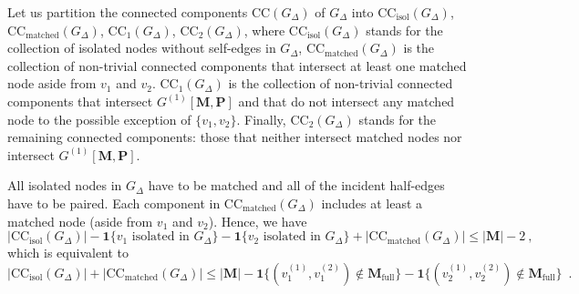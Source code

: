 \documentclass{article}
\begin{document}
Let us partition the connected components $\mathrm{CC}(G_{\Delta})$ of $G_{\Delta}$  into $\mathrm{CC}_{\mathrm{isol}}(G_{\Delta})$, $\mathrm{CC}_{\mathrm{matched}}(G_{\Delta})$, $\mathrm{CC}_{1}(G_{\Delta})$, $\mathrm{CC}_{2}(G_{\Delta})$, where 
$\mathrm{CC}_{\mathrm{isol}}(G_{\Delta})$ stands for the collection of isolated nodes without self-edges in $G_{\Delta}$, $\mathrm{CC}_{\mathrm{matched}}(G_{\Delta})$ is the collection of non-trivial connected components that intersect at least one matched node aside from $v_1$ and $v_2$.
$\mathrm{CC}_{1}(G_{\Delta})$ is the collection of non-trivial connected components that intersect $G^{(1)}[\mathbf{M},\mathbf{P}]$ and that do not intersect any matched node to the possible exception of $\{v_1,v_2\}$. Finally, $\mathrm{CC}_{2}(G_{\Delta})$ stands for the remaining connected components: those that neither intersect matched nodes nor intersect  $G^{(1)}[\mathbf{M},\mathbf{P}]$. 

All isolated nodes in $G_{\Delta}$ have to be matched and all of the incident half-edges have to be paired. Each component in $\mathrm{CC}_{\mathrm{matched}}(G_{\Delta})$ includes at least a matched node (aside from $v_1$ and $v_2$). Hence, we have   
\[
 |\mathrm{CC}_{\mathrm{isol}}(G_{\Delta})| - \mathbf{1}\{v_1\text{ isolated in }G_\Delta\} -  \mathbf{1}\{v_2\text{ isolated in }G_\Delta\} + |\mathrm{CC}_{\mathrm{matched}}(G_{\Delta})|\leq |\mathbf{M}| - 2\ , 
\]
which is equivalent to 
\begin{equation}\label{eq:upper_CC_0}
    |\mathrm{CC}_{\mathrm{isol}}(G_{\Delta})| + |\mathrm{CC}_{\mathrm{matched}}(G_{\Delta})|\leq |\mathbf{M}|-\mathbf{1}\{(v^{(1)}_1,v^{(2)}_1)\notin \mathbf{M}_{\mathrm{full}}\} -\mathbf{1}\{(v^{(1)}_2,v^{(2)}_2) \notin \mathbf{M}_{\mathrm{full}}\}   \enspace . 
\end{equation}
\end{document}
